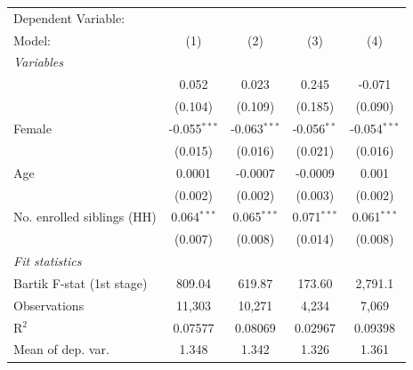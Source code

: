 \begin{tabular}{lcccc}
   \tabularnewline \midrule \midrule
   Dependent Variable: & \\
   Model:                                                                & (1)            & (2)            & (3)           & (4)\\  
   \midrule
   \emph{Variables}\\
        & 0.052          & 0.023          & 0.245         & -0.071\\   
                                                                         & (0.104)        & (0.109)        & (0.185)       & (0.090)\\   
   Female                                                                & -0.055$^{***}$ & -0.063$^{***}$ & -0.056$^{**}$ & -0.054$^{***}$\\   
                                                                         & (0.015)        & (0.016)        & (0.021)       & (0.016)\\   
   Age                                                                   & 0.0001         & -0.0007        & -0.0009       & 0.001\\   
                                                                         & (0.002)        & (0.002)        & (0.003)       & (0.002)\\   
   No. enrolled siblings (HH)                                            & 0.064$^{***}$  & 0.065$^{***}$  & 0.071$^{***}$ & 0.061$^{***}$\\   
                                                                         & (0.007)        & (0.008)        & (0.014)       & (0.008)\\   
   \midrule
   \emph{Fit statistics}\\
   Bartik F-stat (1st stage)                                     & 809.04         & 619.87         & 173.60        & 2,791.1\\  
   Observations                                                          & 11,303         & 10,271         & 4,234         & 7,069\\  
   R$^2$                                                                 & 0.07577        & 0.08069        & 0.02967       & 0.09398\\  
   Mean of dep. var.                                                     & 1.348          & 1.342          & 1.326         & 1.361\\  
\bottomrule
\end{tabular}
